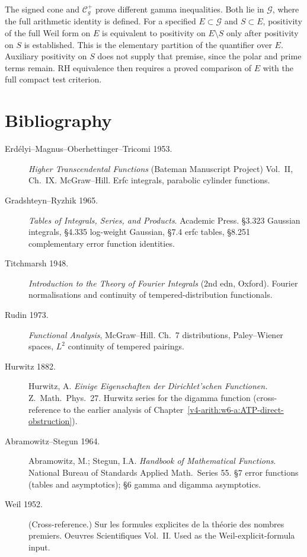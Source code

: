 The signed cone and $\mathcal C_g^+$ prove different gamma
inequalities. Both lie in $\mathscr G$, where the full arithmetic
identity is defined. For a specified $E\subset\mathscr G$ and
$S\subset E$, positivity of the full Weil form on $E$ is equivalent
to positivity on $E\setminus S$ only after positivity on $S$ is
established. This is the elementary partition of the quantifier
over $E$. Auxiliary positivity on $S$ does not supply that premise,
since the polar and prime terms remain. RH equivalence then requires
a proved comparison of $E$ with the full compact test criterion.

\section{Bibliography}
\label{v4-arith:w7-d:bibliography}

\begin{description}
\item[Erd\'elyi--Magnus--Oberhettinger--Tricomi 1953.] \emph{Higher
Transcendental Functions} (Bateman Manuscript Project) Vol.~II,
Ch.~IX. McGraw--Hill. Erfc integrals, parabolic cylinder functions.

\item[Gradshteyn--Ryzhik 1965.] \emph{Tables of Integrals, Series,
and Products}. Academic Press. \S 3.323 Gaussian integrals, \S 4.335
log-weight Gaussian, \S 7.4 erfc tables, \S 8.251 complementary error
function identities.

\item[Titchmarsh 1948.] \emph{Introduction to the Theory of Fourier
Integrals} (2nd edn, Oxford). Fourier normalisations and continuity of
tempered-distribution functionals.

\item[Rudin 1973.] \emph{Functional Analysis}, McGraw--Hill.
Ch.~7 distributions, Paley--Wiener spaces, \(L^{2}\) continuity
of tempered pairings.

\item[Hurwitz 1882.] Hurwitz, A. \emph{Einige Eigenschaften der
Dirichlet'schen Functionen.} Z.~Math.~Phys.~27. Hurwitz series
for the digamma function (cross-reference to the earlier analysis of
Chapter~\ref{v4-arith:w6-a:ATP-direct-obstruction}).

\item[Abramowitz--Stegun 1964.] Abramowitz, M.; Stegun, I.A.
\emph{Handbook of Mathematical Functions}. National Bureau of
Standards Applied Math.~Series 55. \S 7 error functions (tables and
asymptotics); \S 6 gamma and digamma asymptotics.

\item[Weil 1952.] (Cross-reference.) Sur les formules explicites de
la th\'eorie des nombres premiers. Oeuvres Scientifiques Vol.~II.
Used as the Weil-explicit-formula input.
\end{description}
